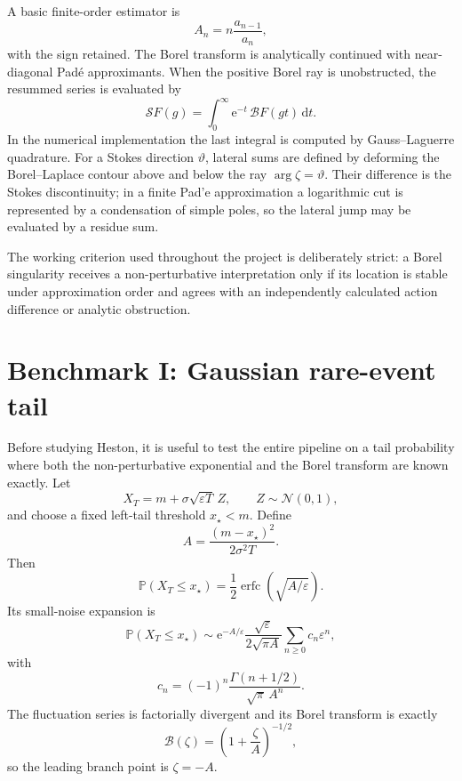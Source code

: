 \documentclass[11pt]{article}
\newcommand{\Pp}{\mathbb P}
\newcommand{\dd}{\mathrm d}
\newcommand{\e}{\mathrm e}
\newcommand{\calB}{\mathcal B}
\begin{document}
A basic finite-order estimator is
\begin{equation}
 A_n=n\frac{a_{n-1}}{a_n},
 \label{eq:ratio}
\end{equation}
with the sign retained. The Borel transform is analytically continued with near-diagonal Pad\'e approximants. When the positive Borel ray is unobstructed, the resummed series is evaluated by
\begin{equation}
 \mathcal S F(g)=\int_0^\infty \e^{-t}\,\calB F(gt)\,\dd t.
 \label{eq:borellaplace}
\end{equation}
In the numerical implementation the last integral is computed by Gauss--Laguerre quadrature. For a Stokes direction $\vartheta$, lateral sums are defined by deforming the Borel--Laplace contour above and below the ray $\arg\zeta=\vartheta$. Their difference is the Stokes discontinuity; in a finite Pad'e approximation a logarithmic cut is represented by a condensation of simple poles, so the lateral jump may be evaluated by a residue sum.

The working criterion used throughout the project is deliberately strict: a Borel singularity receives a non-perturbative interpretation only if its location is stable under approximation order and agrees with an independently calculated action difference or analytic obstruction.

\section{Benchmark I: Gaussian rare-event tail}
Before studying Heston, it is useful to test the entire pipeline on a tail probability where both the non-perturbative exponential and the Borel transform are known exactly. Let
\begin{equation}
 X_T=m+\sigma\sqrt{\varepsilon T}\,Z,
 \qquad Z\sim\mathcal N(0,1),
\end{equation}
and choose a fixed left-tail threshold $x_\star<m$. Define
\begin{equation}
 A=\frac{(m-x_\star)^2}{2\sigma^2T}.
\end{equation}
Then
\begin{equation}
 \Pp(X_T\le x_\star)=\frac12\operatorname{erfc}\!\left(\sqrt{A/\varepsilon}\right).
\end{equation}
Its small-noise expansion is
\begin{equation}
 \Pp(X_T\le x_\star)
 \sim \e^{-A/\varepsilon}\frac{\sqrt\varepsilon}{2\sqrt{\pi A}}
 \sum_{n\ge0}c_n\varepsilon^n,
\end{equation}
with
\begin{equation}
 c_n=(-1)^n\frac{\Gamma(n+1/2)}{\sqrt\pi\,A^n}.
\end{equation}
The fluctuation series is factorially divergent and its Borel transform is exactly
\begin{equation}
 \calB(\zeta)=\left(1+\frac{\zeta}{A}\right)^{-1/2},
\end{equation}
so the leading branch point is $\zeta=-A$.
\end{document}
